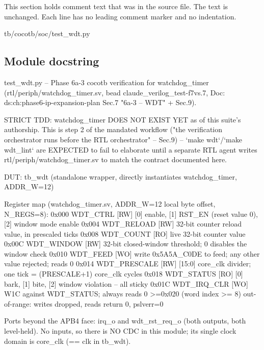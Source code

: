 This section holds comment text that was in the source file. The text is unchanged. Each line has no leading comment marker and no indentation.

\begin{relocated}{tb/cocotb/soc/test_wdt.py}

\subsection*{Module docstring}

\begin{textblock}
test_wdt.py -- Phase 6a-3 cocotb verification for watchdog_timer (rtl/periph/watchdog_timer.sv,
bead claude_verilog_test-f7vs.7, Doc: ds:ch:phase6-ip-expansion-plan Sec.7 "6a-3 -- WDT" + Sec.9).

STRICT TDD: watchdog_timer DOES NOT EXIST YET as of this suite's authorship. This is step 2 of
the mandated workflow ("the verification orchestrator runs before the RTL orchestrator" --
Sec.9) -- `make wdt`/`make wdt_lint` are EXPECTED to fail to elaborate until a separate RTL
agent writes rtl/periph/watchdog_timer.sv to match the contract documented here.

DUT: tb_wdt (standalone wrapper, directly instantiates watchdog_timer, ADDR_W=12)

Register map (watchdog_timer.sv, ADDR_W=12 local byte offset, N_REGS=8):
0x000  WDT_CTRL      [RW]   [0] enable, [1] RST_EN (reset value 0), [2] window mode enable
0x004  WDT_RELOAD    [RW]   32-bit counter reload value, in prescaled ticks
0x008  WDT_COUNT     [RO]   live 32-bit counter value
0x00C  WDT_WINDOW    [RW]   32-bit closed-window threshold; 0 disables the window check
0x010  WDT_FEED      [WO]   write 0x5A5A_C0DE to feed; any other value rejected; reads 0
0x014  WDT_PRESCALE  [RW]   [15:0] core_clk divider; one tick = (PRESCALE+1) core_clk cycles
0x018  WDT_STATUS    [RO]   [0] bark, [1] bite, [2] window violation -- all sticky
0x01C  WDT_IRQ_CLR   [WO]   W1C against WDT_STATUS; always reads 0
>=0x020 (word index >= 8)   out-of-range: writes dropped, reads return 0, pslverr=0

Ports beyond the APB4 face: irq_o and wdt_rst_req_o (both outputs, both level-held). No inputs, so
there is NO CDC in this module; its single clock domain is core_clk (== clk in tb_wdt).


\end{textblock}
\end{relocated}
